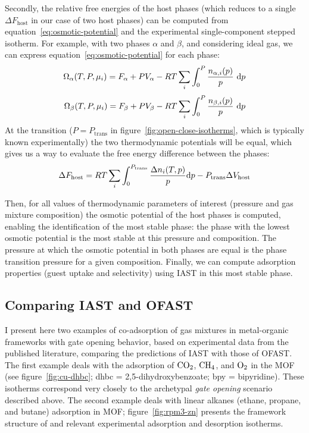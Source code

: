 \documentclass[thesis]{subfiles}
\begin{document}
Secondly, the relative free energies of the host phases (which reduces to a
single $\Delta F_\text{host}$ in our case of two host phases) can be computed
from equation~\eqref{eq:osmotic-potential} and the experimental single-component
stepped isotherm. For example, with two phases $\alpha$ and $\beta$, and
considering ideal gas, we can express equation~\eqref{eq:osmotic-potential} for
each phase:
\[\Omega_\alpha(T, P, \mu_i) = F_\alpha + P V_\alpha - RT \sum_i \int_0^P \frac{n_{\alpha, i}(p)}{p} \ \d p\]
\[\Omega_\beta(T, P, \mu_i) = F_\beta + P V_\beta - RT \sum_i \int_0^P \frac{n_{\beta, i}(p)}{p} \ \text{d} p\]
At the transition ($P=P_\text{trans}$ in figure~\ref{fig:open-close-isotherms},
which is typically known experimentally) the two thermodynamic potentials will
be equal, which gives us a way to evaluate the free energy difference between
the phases:
\[ \label{eq:ofast:delta-f}\Delta F_\text{host} = RT \sum_i \int_0^{P_\text{trans}} \frac{\Delta n_i(T, p)}{p} \text{d} p - P_\text{trans} \Delta V_\text{host}\]

Then, for all values of thermodynamic parameters of interest (pressure and gas
mixture composition) the osmotic potential of the host phases is computed,
enabling the identification of the most stable phase: the phase with the lowest
osmotic potential is the most stable at this pressure and composition. The
pressure at which the osmotic potential in both phases are equal is the phase
transition pressure for a given composition. Finally, we can compute adsorption
properties (guest uptake and selectivity) using IAST in this most stable phase.

\subsection{Comparing IAST and OFAST}

I present here two examples of co-adsorption of gas mixtures in metal-organic
frameworks with gate opening behavior, based on experimental data from the
published literature, comparing the predictions of IAST with those of OFAST. The
first example deals with the adsorption of $\ce{CO2}$, $\ce{CH4}$, and $\ce{O2}$
in the \Cudhbc MOF\cite{Kitaura2003} (see figure~\ref{fig:cu-dhbc}; dhbc =
2,5-dihydroxybenzoate; bpy = bipyridine). These isotherms correspond very
closely to the archetypal \emph{gate opening} scenario described above. The
second example deals with linear alkanes (ethane, propane, and butane)
adsorption in \RPMZn MOF\cite{Nijem2012}; figure~\ref{fig:rpm3-zn} presents the
framework structure of \RPMZn and relevant experimental adsorption and
desorption isotherms.
\end{document}
